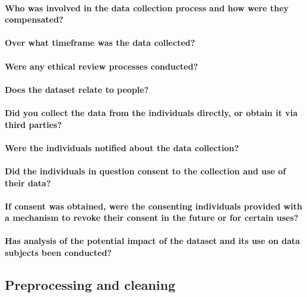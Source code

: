 \paragraph{Who was involved in the data collection process and how were they compensated?}

\paragraph{Over what timeframe was the data collected?}

\paragraph{Were any ethical review processes conducted?}

\paragraph{Does the dataset relate to people?}

\paragraph{Did you collect the data from the individuals directly, or obtain it via third parties?}

\paragraph{Were the individuals notified about the data collection?}

\paragraph{Did the individuals in question consent to the collection and use of their data?}

\paragraph{If consent was obtained, were the consenting individuals provided with a mechanism to revoke their consent in the future or for certain uses?}

\paragraph{Has analysis of the potential impact of the dataset and its use on data subjects been conducted?}

\subsection{Preprocessing and cleaning}

